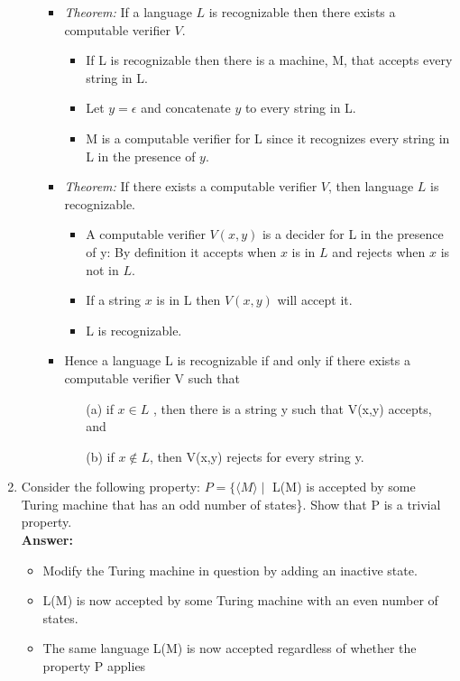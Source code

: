 \documentclass[12pt]{article}
\begin{document}
\begin{enumerate}
\begin{enumerate}
	\begin{itemize}
	\item \textit{Theorem: }If a language $L$ is recognizable then there exists a computable verifier $V$.
	\begin{itemize}
	\item If L is recognizable then there is a machine, M, that accepts every string in L.
	\item Let $y = \epsilon$ and concatenate $y$ to every string in L.
	\item M is a computable verifier for L since it recognizes every string in L in the presence of $y$.
	\end{itemize}
	\item \textit{Theorem: } If there exists a computable verifier $V$, then language $L$ is recognizable.
	\begin{itemize}
	\item A computable verifier $V(x,y)$ is a decider for L in the presence of y: By definition it accepts when $x$ is in $L$ and rejects when $x$ is not in $L$.
	\item If a string $x$ is in L then $V(x,y)$ will accept it.
	\item L is recognizable.
	\end{itemize}
	\item Hence a language L is recognizable if and only if there exists a computable verifier V such that
		\begin{enumerate}
		\item [(a)]if $x \in L$ , then there is a string y such that V(x,y) accepts, and
		\item [(b)]if $x \notin L$, then V(x,y) rejects for every string y.
		\end{enumerate}
	\end{itemize}
\end{enumerate}
\item Consider the following property: $P = \{\langle M \rangle \mid$ L(M) is accepted by some Turing machine that has an odd number of states\}. Show that P is a trivial property.
		\\[.2in]\textbf{Answer:}
	\begin{itemize}
	\item Modify the Turing machine in question by adding an inactive state.  
	\item L(M) is now accepted by some Turing machine with an even number of states. 
	\item The same language L(M) is now accepted regardless of whether the property P applies

\end{itemize}
\end{enumerate}
\end{document}
